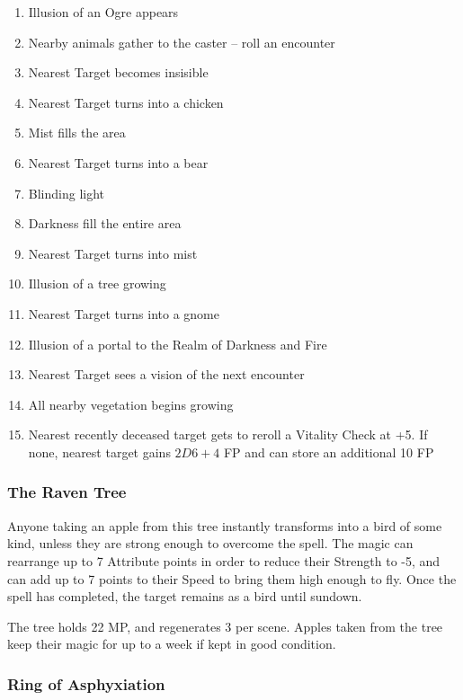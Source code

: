 \begin{tcolorbox}
	\begin{enumerate}
		\item{Illusion of an Ogre appears}
		\item{Nearby animals gather to the caster -- roll an encounter}
		\item{Nearest Target becomes insisible}
		\item{Nearest Target turns into a chicken}
		\item{Mist fills the area}
		\item{Nearest Target turns into a bear}
		\item{Blinding light}
		\item{Darkness fill the entire area}
		\item{Nearest Target turns into mist}
		\item{Illusion of a tree growing}
		\item{Nearest Target turns into a gnome}
		\item{Illusion of a portal to the Realm of Darkness and Fire}
		\item{Nearest Target sees a vision of the next encounter}
		\item{All nearby vegetation begins growing}
		\item{Nearest recently deceased target gets to reroll a Vitality Check at +5.  If none, nearest target gains $2D6+4$ FP and can store an additional 10 FP}
	\end{enumerate}
\end{tcolorbox}

\subsubsection{The Raven Tree}
Anyone taking an apple from this tree instantly transforms into a bird of some kind, unless they are strong enough to overcome the spell.  The magic can rearrange up to 7 Attribute points in order to reduce their Strength to -5, and can add up to 7 points to their Speed to bring them high enough to fly.  Once the spell has completed, the target remains as a bird until sundown.

The tree holds 22 MP, and regenerates 3 per scene.  Apples taken from the tree keep their magic for up to a week if kept in good condition.

\subsubsection{Ring of Asphyxiation}

